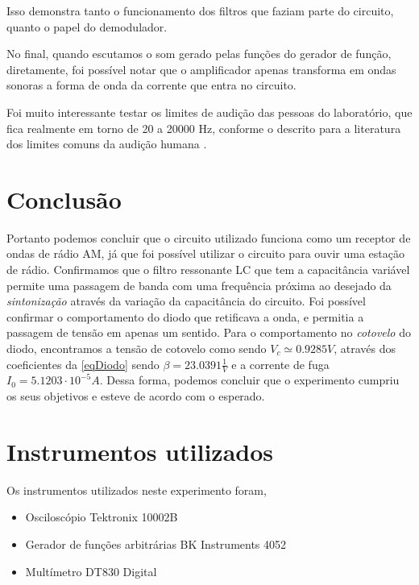 \documentclass[11pt,a4paper]{article}
\begin{document}
    Isso demonstra tanto o funcionamento dos filtros que faziam parte do circuito, quanto o papel do demodulador.
    
    No final, quando escutamos o som gerado pelas funções do gerador de função, diretamente, foi possível notar que o amplificador apenas transforma em ondas sonoras a forma de onda da corrente que entra no circuito.
    
    Foi muito interessante testar os limites de audição das pessoas do laboratório, que fica realmente em torno de 20 a 20000 Hz, conforme o descrito para a literatura dos limites comuns da audição humana \cite{limiteAudicao}.
    
\section{Conclusão}


    Portanto podemos concluir que o circuito utilizado funciona como um receptor de ondas de rádio AM, já que foi possível utilizar o circuito para ouvir uma estação de rádio. Confirmamos que o filtro ressonante LC que tem a capacitância variável permite uma passagem de banda com uma frequência próxima ao desejado da \textit{sintonização} através da variação da capacitância do circuito. Foi possível confirmar o comportamento do diodo que retificava a onda, e permitia a passagem de tensão em apenas um sentido. Para o comportamento no \textit{cotovelo} do diodo, encontramos a tensão de cotovelo como sendo $V_c \simeq 0.9285 V$, através dos coeficientes da \cref{eqDiodo} sendo $\beta = 23.0391 \frac{1}{V}$ e a corrente de fuga $I_0 = 5.1203\cdot10^{-5} A$. Dessa forma, podemos concluir que o experimento cumpriu os seus objetivos e esteve de acordo com o esperado.


\section{Instrumentos utilizados}

    Os instrumentos utilizados neste experimento foram,
    \begin{itemize}
    	\item Osciloscópio Tektronix 10002B
    	\item Gerador de funções arbitrárias BK Instruments 4052
    	\item Multímetro DT830 Digital
    \end{itemize}
\end{document}

